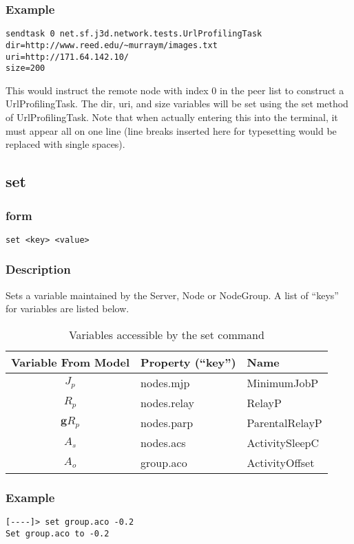 \documentclass[12pt]{article}
\begin{document}
\subsubsection{Example}
\begin{verbatim}
sendtask 0 net.sf.j3d.network.tests.UrlProfilingTask
dir=http://www.reed.edu/~murraym/images.txt
uri=http://171.64.142.10/
size=200
\end{verbatim}
This would instruct the remote node with index 0 in the peer list to construct a UrlProfilingTask. The dir, uri, and size variables will be set using the set method of UrlProfilingTask. Note that when actually entering this into the terminal, it must appear all on one line (line breaks inserted here for typesetting would be replaced with single spaces).

\subsection{set}
\subsubsection{form}
\begin{verbatim}
set <key> <value>
\end{verbatim}
\subsubsection{Description}
Sets a variable maintained by the Server,  Node or NodeGroup. A list of ``keys'' for variables are listed below.
\begin{table}[h]
\begin{center}
\begin{tabular}{c p{4 cm} p{4 cm}}
\hline\hline
Variable From Model & Property (``key'') & Name\\ [1ex]
\hline
$J_{p}$ & nodes.mjp & MinimumJobP \\ [1ex]
$R_{p}$ & nodes.relay & RelayP \\ [1 ex]
$\textbf{g}R_{p}$ & nodes.parp & ParentalRelayP \\ [1 ex]
$A_{s}$ & nodes.acs & ActivitySleepC \\ [1ex]
$A_{o}$ & group.aco & ActivityOffset \\ [1ex]
\hline
\end{tabular}
\end{center}
\caption{Variables accessible by the set command}
\end{table}
\subsubsection{Example}
\begin{verbatim}
[----]> set group.aco -0.2
Set group.aco to -0.2
\end{verbatim}
\end{document}
